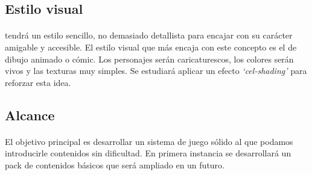 \subsection{Estilo visual}
\label{sec:int-estilo}

\paragraph{}
\juego tendrá un estilo sencillo, no demasiado detallista para encajar con
su carácter amigable y accesible. El estilo visual que más encaja con este
concepto es el de dibujo animado o cómic. Los personajes serán caricaturescos,
los colores serán vivos y las texturas muy simples. Se estudiará aplicar un
efecto \emph{`cel-shading'} para reforzar esta idea.

\subsection{Alcance}
\label{sec:int-alcance}

\paragraph{}
El objetivo principal es desarrollar un sistema de juego sólido al que podamos
introducirle contenidos sin dificultad. En primera instancia se desarrollará
un pack de contenidos básicos que será ampliado en un futuro.

